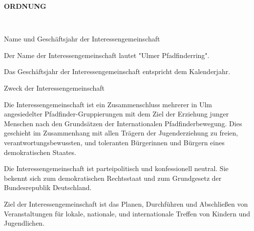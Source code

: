 \begin{Large}
    \textbf{ORDNUNG}
\end{Large}
\\



\begin{legal}
    \item Name und Geschäftsjahr der Interessengemeinschaft
        \begin{legal}
            \item Der Name der Interessengemeinschaft lautet "Ulmer Pfadfinderring".
            \item Das Geschäftsjahr der Interessengemeinschaft entspricht dem Kalenderjahr.
        \end{legal}
    \item Zweck der Interessengemeinschaft
        \begin{legal}
            \item Die Interessengemeinschaft ist ein Zusammenschluss mehrerer in Ulm angesiedelter
                  Pfadfinder-Gruppierungen mit dem Ziel der Erziehung junger Menschen nach den 
                  Grundsätzen der Internationalen Pfadfinderbewegung. Dies geschieht im Zusammenhang 
                  mit allen Trägern der Jugenderziehung zu freien, verantwortungsbewussten, und 
                  toleranten Bürgerinnen und Bürgern eines demokratischen Staates.
            \item Die Interessengemeinschaft ist parteipolitisch und konfessionell neutral. 
                  Sie bekennt sich zum demokratischen Rechtsstaat und zum Grundgesetz der 
                  Bundesrepublik Deutschland.
            \item Ziel der Interessengemeinschaft ist das Planen, Durchführen und Abschließen von 
                  Veranstaltungen für lokale, nationale, und internationale Treffen von 
                  Kindern und Jugendlichen.
        \end{legal}

\end{legal}

